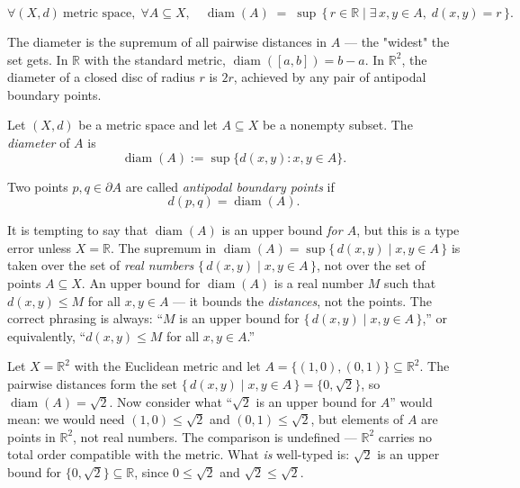 \begin{remark*}
\[
\forall (X,d)\ \text{metric space},\;
\forall A \subseteq X,\quad
\operatorname{diam}(A)
\;=\;
\sup\,\{\, r \in \mathbb{R} \mid
  \exists\, x, y \in A,\; d(x,y) = r \,\}.
\]
\end{remark*}



\begin{remark*}[Intuition]
The diameter is the supremum of all pairwise distances in $A$ ---
the "widest" the set gets.
In $\mathbb{R}$ with the standard metric, $\operatorname{diam}([a,b]) = b - a$.
In $\mathbb{R}^2$, the diameter of a closed disc of radius $r$ is $2r$,
achieved by any pair of antipodal boundary points.
\end{remark*}


\begin{definition}
Let $(X,d)$ be a metric space and let $A \subseteq X$ be a nonempty subset.
The \emph{diameter} of $A$ is
\[
\operatorname{diam}(A)
:=
\sup\{ d(x,y) : x,y \in A \}.
\]

Two points $p,q \in \partial A$ are called \emph{antipodal boundary points}
if
\[
d(p,q) = \operatorname{diam}(A).
\]
\end{definition}

\begin{remark*}
It is tempting to say that $\operatorname{diam}(A)$ is an upper bound
\emph{for $A$}, but this is a type error unless $X = \mathbb{R}$.
The supremum in $\operatorname{diam}(A) = \sup\{\, d(x,y) \mid x, y \in A \,\}$
is taken over the set of \emph{real numbers}
$\{\, d(x,y) \mid x, y \in A \,\}$, not over the set of points $A \subseteq X$.
An upper bound for $\operatorname{diam}(A)$ is a real number $M$ such that
$d(x,y) \le M$ for all $x, y \in A$ --- it bounds the \emph{distances},
not the points.
The correct phrasing is always:
``$M$ is an upper bound for $\{\, d(x,y) \mid x, y \in A \,\}$,''
or equivalently, ``$d(x,y) \le M$ for all $x, y \in A$.''
\end{remark*}

\begin{example*}
Let $X = \mathbb{R}^2$ with the Euclidean metric and let
$A = \{(1,0),(0,1)\} \subseteq \mathbb{R}^2$.
The pairwise distances form the set
$\{\, d(x,y) \mid x, y \in A \,\} = \{0, \sqrt{2}\}$,
so $\operatorname{diam}(A) = \sqrt{2}$.
Now consider what ``$\sqrt{2}$ is an upper bound for $A$'' would mean:
we would need $(1,0) \le \sqrt{2}$ and $(0,1) \le \sqrt{2}$, but elements
of $A$ are points in $\mathbb{R}^2$, not real numbers.
The comparison is undefined --- $\mathbb{R}^2$ carries no total order
compatible with the metric.
What \emph{is} well-typed is: $\sqrt{2}$ is an upper bound for
$\{0,\sqrt{2}\} \subseteq \mathbb{R}$, since $0 \le \sqrt{2}$ and
$\sqrt{2} \le \sqrt{2}$.
\end{example*}

